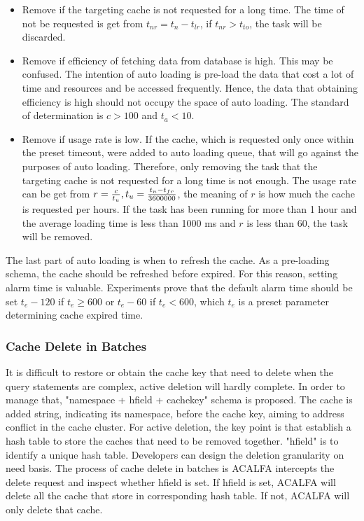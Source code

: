 \documentclass{singlecol-new}
\theoremstyle{TH}{
\newtheorem{lemma}{Lemma}
\newtheorem{theorem}[lemma]{Theorem}
\newtheorem{corrolary}[lemma]{Corrolary}
\newtheorem{conjecture}[lemma]{Conjecture}
\newtheorem{proposition}[lemma]{Proposition}
\newtheorem{claim}[lemma]{Claim}
\newtheorem{stheorem}[lemma]{Wrong Theorem}
}
\theoremstyle{THrm}{
\newtheorem{definition}{Definition}[section]
\newtheorem{question}{Question}[section]
\newtheorem{remark}{Remark}
\newtheorem{scheme}{Scheme}
}
\theoremstyle{THhit}{
\newtheorem{case}{Case}[section]
}
\begin{document}
\begin{itemize}
    \item Remove if the targeting cache is not requested for a long time. The time of not be requested is get from $t_{nr} = t_n - t_{lr}$, if $t_{nr} > t_{to}$, the task will be discarded.
    \item Remove if efficiency of fetching data from database is high. This may be confused. The intention of auto loading is pre-load the data that cost a lot of time and resources and be accessed frequently. Hence, the data that obtaining efficiency is high should not occupy the space of auto loading. The standard of determination is $c > 100$ and $t_a < 10$.
    \item Remove if usage rate is low. If the cache, which is requested only once within the preset timeout, were added to auto loading queue, that will go against the purposes of auto loading. Therefore, only removing the task that the targeting cache is not requested for a long time is not enough. The usage rate can be get from $r = \frac{c}{t_u}, t_u = {{t_n - t_{fr}}\over{3600000}}$, the meaning of $r$ is how much the cache is requested per hours. If the task has been running for more than 1 hour and the average loading time is less than 1000 ms and $r$ is less than 60, the task will be removed.
\end{itemize}{}

The last part of auto loading is when to refresh the cache. As a pre-loading schema, the cache should be refreshed before expired. For this reason, setting alarm time is valuable. Experiments prove that the default alarm time should be set $t_e - 120$ if $t_e \geq 600$ or $t_e - 60$ if $t_e < 600$, which $t_e$ is a preset parameter determining cache expired time.


\subsubsection{Cache Delete in Batches}
It is difficult to restore or obtain the cache key that need to delete when the query statements are complex, active deletion will hardly complete. In order to manage that, "namespace + hfield + cachekey" schema is proposed. The cache is added string, indicating its namespace, before the cache key, aiming to address conflict in the cache cluster. For active deletion, the key point is that establish a hash table to store the caches that need to be removed together. "hfield" is to identify a unique hash table. Developers can design the deletion granularity on need basis. The process of cache delete in batches is ACALFA intercepts the delete request and inspect whether hfield is set. If hfield is set, ACALFA will delete all the cache that store in corresponding hash table. If not, ACALFA will only delete that cache.
\end{document}
